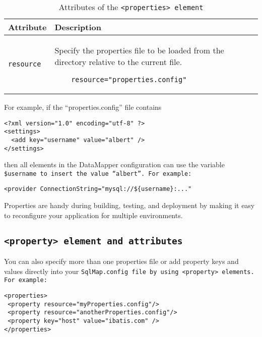 \begin{table}[!hpt]
\caption{Attributes of the \tt{<properties>} element} \label{table:4.3}
\centering
\begin{tabular}{|l|l|}
 \hline
 \textbf{Attribute} & \textbf{Description} \\
 \hline
 \tt{resource} &
  \begin{minipage}{0.7\textwidth}\vspace{2mm}
    Specify the properties file to be loaded from the directory relative to
    the current file.
    \vspace{-3mm}\begin{verbatim}
    resource="properties.config"
    \end{verbatim}\vspace{-5mm}
  \end{minipage}
  \\
  \hline
\end{tabular}
\end{table}

For example, if the ``properties.config'' file contains

\begin{verbatim}
<?xml version="1.0" encoding="utf-8" ?>
<settings>
  <add key="username" value="albert" />
</settings>
\end{verbatim}

then all elements in the DataMapper configuration can use the variable
\tt{\${username}} to insert the value ``albert''. For example:

\begin{verbatim}
<provider ConnectionString="mysql://${username}:..."
\end{verbatim}

Properties are handy during building, testing, and deployment by making it
easy to reconfigure your application for multiple environments.

\subsection{\tt{<property>} element and attributes}
You can also specify more than one properties file or add property keys and
values directly into your \tt{SqlMap.config} file by using \tt{<property>}
elements. For example:

\begin{verbatim}
<properties>
 <property resource="myProperties.config"/>
 <property resource="anotherProperties.config"/>
 <property key="host" value="ibatis.com" />
</properties>
\end{verbatim}

